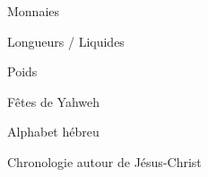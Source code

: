 \documentclass[11pt]{book}
\begin{document}
\clearpage
\begin{center}Monnaies\end{center}\clearpage
\clearpage
\begin{center}Longueurs / Liquides\end{center}\clearpage
\clearpage
\begin{center}Poids\end{center}\clearpage
\clearpage
\begin{center}Fêtes de Yahweh\end{center}\clearpage
\clearpage
\begin{center}Alphabet hébreu\end{center}\clearpage
\clearpage
\begin{center}Chronologie autour de Jésus-Christ\end{center}\clearpage
\end{document}
